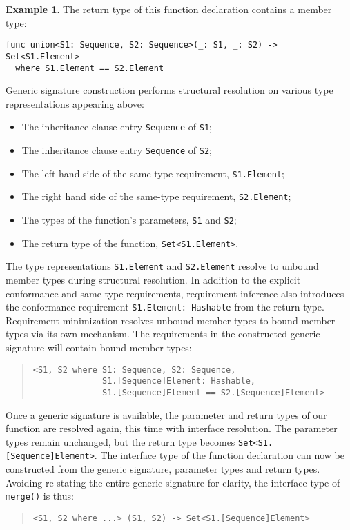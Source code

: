\documentclass[a4paper,headsepline,bibliography=totoc,toc=flat,fleqn,twoside=semi]{scrbook}
\theoremstyle{definition}
\theoremstyle{definition}
\newtheorem{example}{Example}[chapter]
\theoremstyle{definition}
\begin{document}
\begin{example}
The return type of this function declaration contains a member type:
\begin{Verbatim}
func union<S1: Sequence, S2: Sequence>(_: S1, _: S2) -> Set<S1.Element>
  where S1.Element == S2.Element
\end{Verbatim}
Generic signature construction performs structural resolution on various type representations appearing above:
\begin{itemize}
\item The inheritance clause entry \texttt{Sequence} of \texttt{S1};
\item The inheritance clause entry \texttt{Sequence} of \texttt{S2};
\item The left hand side of the same-type requirement, \texttt{S1.Element};
\item The right hand side of the same-type requirement, \texttt{S2.Element};
\item The types of the function's parameters, \texttt{S1} and \texttt{S2};
\item The return type of the function, \texttt{Set<S1.Element>}.
\end{itemize}
The type representations \texttt{S1.Element} and \texttt{S2.Element} resolve to unbound member types during structural resolution. In addition to the explicit conformance and same-type requirements, requirement inference also introduces the conformance requirement \texttt{S1.Element:~Hashable} from the return type. Requirement minimization resolves unbound member types to bound member types via its own mechanism. The requirements in the constructed generic signature will contain bound member types:
\begin{quote}
\begin{verbatim}
<S1, S2 where S1: Sequence, S2: Sequence,
              S1.[Sequence]Element: Hashable,
              S1.[Sequence]Element == S2.[Sequence]Element>
\end{verbatim}
\end{quote}
Once a generic signature is available, the parameter and return types of our function are resolved again, this time with interface resolution. The parameter types remain unchanged, but the return type becomes \texttt{Set<S1.[Sequence]Element>}. The interface type of the function declaration can now be constructed from the generic signature, parameter types and return types. Avoiding re-stating the entire generic signature for clarity, the interface type of \texttt{merge()} is thus:
\begin{quote}
\begin{verbatim}
<S1, S2 where ...> (S1, S2) -> Set<S1.[Sequence]Element>
\end{verbatim}
\end{quote}
\end{example}
\end{document}

